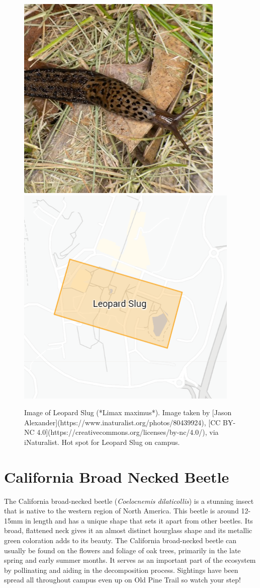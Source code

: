 \documentclass[
]{book}
\begin{document}
\begin{figure}

{\centering \includegraphics[width=0.49\linewidth,height=0.2\textheight]{insect_images/slug_11} \includegraphics[width=0.49\linewidth,height=0.2\textheight]{insect_images/slug_hotspot_11} 

}

\caption{Image of Leopard Slug (*Limax maximus*). Image taken by [Jason Alexander](https://www.inaturalist.org/photos/80439924), [CC BY-NC 4.0](https://creativecommons.org/licenses/by-nc/4.0/), via iNaturalist. Hot spot for Leopard Slug on campus.}\label{fig:unnamed-chunk-9}
\end{figure}

\hypertarget{california-broad-necked-beetle}{%
\section{California Broad Necked Beetle}\label{california-broad-necked-beetle}}

The California broad-necked beetle (\emph{Coelocnemis dilaticollis}) is a stunning insect that is native to the western region of North America. This beetle is around 12-15mm in length and has a unique shape that sets it apart from other beetles. Its broad, flattened neck gives it an almost distinct hourglass shape and its metallic green coloration adds to its beauty. The California broad-necked beetle can usually be found on the flowers and foliage of oak trees, primarily in the late spring and early summer months. It serves as an important part of the ecosystem by pollinating and aiding in the decomposition process. Sightings have been spread all throughout campus even up on Old Pine Trail so watch your step!
\end{document}

